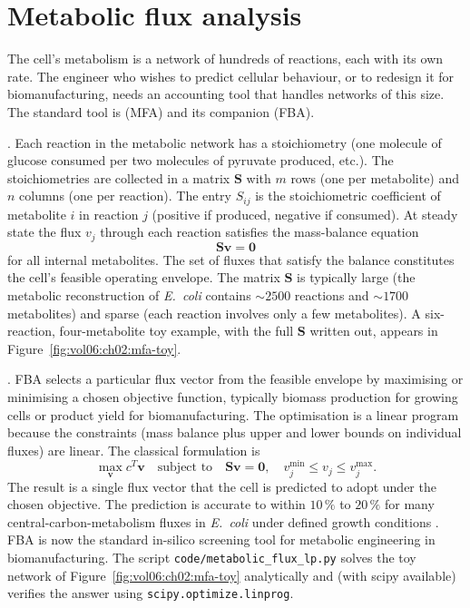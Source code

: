 \section{Metabolic flux analysis}

The cell's metabolism is a network of hundreds of reactions, each
with its own rate. The engineer who wishes to predict cellular
behaviour, or to redesign it for biomanufacturing, needs an
accounting tool that handles networks of this size. The standard
tool is  (MFA) and its companion
 (FBA).

. Each reaction in the metabolic
network has a stoichiometry (one molecule of glucose consumed per
two molecules of pyruvate produced, etc.). The stoichiometries are
collected in a matrix $\mathbf{S}$ with $m$ rows (one per metabolite)
and $n$ columns (one per reaction). The entry $S_{ij}$ is the
stoichiometric coefficient of metabolite $i$ in reaction $j$ (positive
if produced, negative if consumed). At steady state the flux $v_j$
through each reaction satisfies the mass-balance equation
\[
\mathbf{S} \mathbf{v} = \mathbf{0}
\]
for all internal metabolites. The set of fluxes that satisfy the
balance constitutes the cell's feasible operating envelope. The
matrix $\mathbf{S}$ is typically large (the metabolic reconstruction
of \emph{E.~coli} contains $\sim 2500$ reactions and $\sim 1700$
metabolites) and sparse (each reaction involves only a few
metabolites). A six-reaction, four-metabolite toy example, with the
full $\mathbf{S}$ written out, appears in
Figure~\ref{fig:vol06:ch02:mfa-toy}.



. FBA selects a particular flux vector
from the feasible envelope by maximising or minimising a chosen
objective function, typically biomass production for growing cells or
product yield for biomanufacturing. The optimisation is a linear
program because the constraints (mass balance plus upper and lower
bounds on individual fluxes) are linear. The classical formulation
is
\[
\max_{\mathbf{v}} c^T \mathbf{v} \quad \text{subject to} \quad
\mathbf{S} \mathbf{v} = \mathbf{0}, \quad v_j^{\min} \le v_j \le v_j^{\max}.
\]
The result is a single flux vector that the cell is predicted to
adopt under the chosen objective. The prediction is accurate to within
$10\,\%$ to $20\,\%$ for many central-carbon-metabolism fluxes in
\emph{E.~coli} under defined growth conditions
\cite[ch.~3]{text:alon-systems-biology,paper:v6c02-orth-cobra-2010}.
FBA is now the standard in-silico screening tool for metabolic
engineering in biomanufacturing. The script
\texttt{code/metabolic\_flux\_lp.py} solves the toy network of
Figure~\ref{fig:vol06:ch02:mfa-toy} analytically and (with scipy
available) verifies the answer using
\texttt{scipy.optimize.linprog}.

